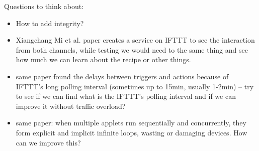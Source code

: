 \bigskip
Questions to think about:
\begin{itemize}[leftmargin=*]
\item How to add integrity?
\item Xiangchang Mi et al. paper creates a service on IFTTT to see the interaction from both channels,
while testing we would need to the same thing and see how much we can learn about the recipe or
other things.
\item same paper found the delays between triggers and actions because of IFTTT's long polling interval (sometimes up to 15min, usually 1-2min) -- try to see if we can find what is the IFTTT's polling interval and if we can improve it without traffic overload?
\item same paper: when multiple applets run sequentially and concurrently, they form explicit and implicit infinite loops, wasting or damaging devices. How can we improve this?
\end{itemize}
\fi
